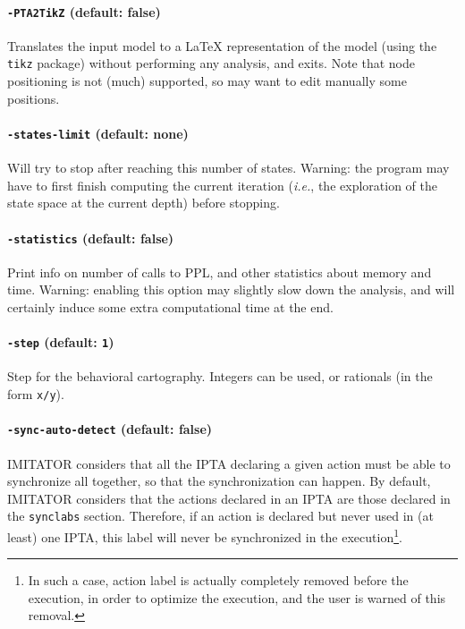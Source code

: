\documentclass[a4paper,11pt]{report}
\makeatletter
\newcommand{\imitator}{\textsf{IMITATOR}}
\newcommand{\IPTA}{IPTA}
\newcommand{\styleIMI}[1]{\textcolor{imicolor}{\texttt{#1}}}
\newcommand{\styleOption}[1]{\textcolor{optioncolor}{\texttt{#1}}}
\newcommand{\ie}{\textcolor{colorok}{\textit{i.e.},\@}}
\makeatother
\begin{document}
\paragraph{\styleOption{-PTA2TikZ} (default: false)}
Translates the input model to a \LaTeX{} representation of the model (using the \texttt{tikz} package) without performing any analysis, and exits.
Note that node positioning is not (much) supported, so may want to edit manually some positions.

\paragraph{\styleOption{-states-limit} (default: none)}
Will try to stop after reaching this number of states.
Warning: the program may have to first finish computing the current iteration (\ie{} the exploration of the state space at the current depth) before stopping.


\paragraph{\styleOption{-statistics} (default: false)}
Print info on number of calls to PPL, and other statistics about memory and time.
Warning: enabling this option may slightly slow down the analysis, and will certainly induce some extra computational time at the end.



\paragraph{\styleOption{-step} (default: \styleOption{1})}
Step for the behavioral cartography.
Integers can be used, or rationals (in the form \styleOption{x/y}).

\paragraph{\styleOption{-sync-auto-detect} (default: false)}
\imitator{} considers that all the \IPTA{} declaring a given action must be able to synchronize all together, so that the synchronization can happen.
By default, \imitator{} considers that the actions declared in an \IPTA{} are those declared in the \styleIMI{synclabs} section.
Therefore, if an action is declared but never used in (at least) one \IPTA{}, this label will never be synchronized in the execution\footnote{In such a case, action label is actually completely removed before the execution, in order to optimize the execution, and the user is warned of this removal.}.
\end{document}
